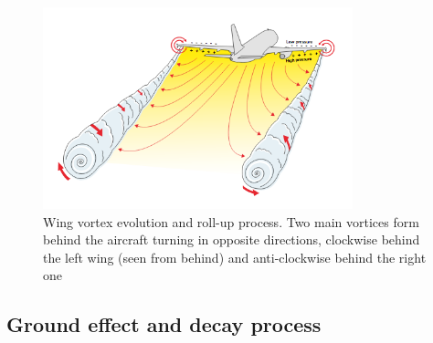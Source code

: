 \begin{figure}
    \centering
    \includegraphics[width=0.8\textwidth]{graphics/WakeVortexPlane.png}
    \caption[Wake vortex roll-up process]{Wing vortex evolution and roll-up process. Two main vortices form behind the aircraft turning in opposite directions, clockwise behind the left wing (seen from behind) and anti-clockwise behind the right one \cite[p. 043]{magazine_aibus_safety}} \label{fig:vortex_develop}
\end{figure}

\subsection{Ground effect and decay process}

